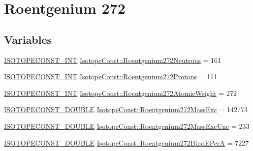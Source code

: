 \hypertarget{group___isotope_const-_roentgenium-_rg272}{}\section{Roentgenium 272}
\label{group___isotope_const-_roentgenium-_rg272}
\subsection*{Variables}
\begin{DoxyCompactItemize}
\item 
\mbox{\hyperlink{group___isotope_const-_macros_ga5f18360b3e99483a35c32d789e62621c}{I\+S\+O\+T\+O\+P\+E\+C\+O\+N\+S\+T\+\_\+\+I\+NT}} \mbox{\hyperlink{group___isotope_const-_roentgenium-_rg272_ga540afa33ebfd4a15408e4eb551dc92de}{Isotope\+Const\+::\+Roentgenium272\+Neutrons}} = 161
\item 
\mbox{\hyperlink{group___isotope_const-_macros_ga5f18360b3e99483a35c32d789e62621c}{I\+S\+O\+T\+O\+P\+E\+C\+O\+N\+S\+T\+\_\+\+I\+NT}} \mbox{\hyperlink{group___isotope_const-_roentgenium-_rg272_ga4e782dface87ca382786fd99f4077a51}{Isotope\+Const\+::\+Roentgenium272\+Protons}} = 111
\item 
\mbox{\hyperlink{group___isotope_const-_macros_ga5f18360b3e99483a35c32d789e62621c}{I\+S\+O\+T\+O\+P\+E\+C\+O\+N\+S\+T\+\_\+\+I\+NT}} \mbox{\hyperlink{group___isotope_const-_roentgenium-_rg272_ga5cd761f9b9034db0b24cbbe4b39e6f8c}{Isotope\+Const\+::\+Roentgenium272\+Atomic\+Weight}} = 272
\item 
\mbox{\hyperlink{group___isotope_const-_macros_ga8f45a7272ce02c0b4c65c44636ed719a}{I\+S\+O\+T\+O\+P\+E\+C\+O\+N\+S\+T\+\_\+\+D\+O\+U\+B\+LE}} \mbox{\hyperlink{group___isotope_const-_roentgenium-_rg272_ga4d2a09d0d572eda79c5582e48b58e7a2}{Isotope\+Const\+::\+Roentgenium272\+Mass\+Exc}} = 142773
\item 
\mbox{\hyperlink{group___isotope_const-_macros_ga8f45a7272ce02c0b4c65c44636ed719a}{I\+S\+O\+T\+O\+P\+E\+C\+O\+N\+S\+T\+\_\+\+D\+O\+U\+B\+LE}} \mbox{\hyperlink{group___isotope_const-_roentgenium-_rg272_ga2054ef1650e654af8c026e0b2232d40e}{Isotope\+Const\+::\+Roentgenium272\+Mass\+Exc\+Unc}} = 233
\item 
\mbox{\hyperlink{group___isotope_const-_macros_ga8f45a7272ce02c0b4c65c44636ed719a}{I\+S\+O\+T\+O\+P\+E\+C\+O\+N\+S\+T\+\_\+\+D\+O\+U\+B\+LE}} \mbox{\hyperlink{group___isotope_const-_roentgenium-_rg272_ga46d3b918956194ce446777b598bab95b}{Isotope\+Const\+::\+Roentgenium272\+Bind\+E\+PerA}} = 7227

\end{DoxyCompactItemize}
